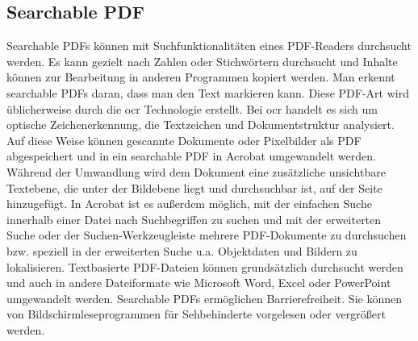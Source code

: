 \subsection{Searchable PDF}
Searchable PDFs können mit Suchfunktionalitäten eines PDF-Readers durchsucht werden. Es kann gezielt nach Zahlen oder Stichwörtern durchsucht und Inhalte können zur Bearbeitung in anderen Programmen kopiert werden. Man erkennt searchable PDFs daran, dass man den Text markieren kann. Diese PDF-Art wird üblicherweise durch die \gls{ocr} Technologie erstellt. Bei \gls{ocr} handelt es sich um optische Zeichenerkennung, die Textzeichen und Dokumentstruktur analysiert. Auf diese Weise können gescannte Dokumente oder Pixelbilder als PDF abgespeichert und in ein searchable PDF in Acrobat umgewandelt werden. Während der Umwandlung wird dem Dokument eine zusätzliche unsichtbare Textebene, die unter der Bildebene liegt und durchsuchbar ist, auf der Seite hinzugefügt. In Acrobat ist es außerdem möglich, mit der einfachen Suche innerhalb einer Datei nach Suchbegriffen zu suchen und mit der erweiterten Suche oder der Suchen-Werkzeugleiste mehrere PDF-Dokumente zu durchsuchen bzw. speziell in der erweiterten Suche u.a. Objektdaten und Bildern zu lokalisieren. Textbasierte PDF-Dateien können grundsätzlich durchsucht werden und auch in andere Dateiformate wie Microsoft Word, Excel oder PowerPoint umgewandelt werden. Searchable PDFs ermöglichen Barrierefreiheit. Sie können von Bildschirmleseprogrammen für Sehbehinderte vorgelesen oder vergrößert werden\cite{adobe-search}. 